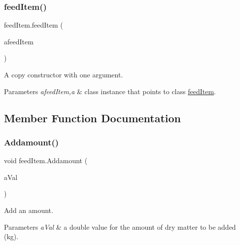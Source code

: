 \subsubsection{\texorpdfstring{feedItem()}{feedItem()}\hspace{0.1cm}{\footnotesize\ttfamily [3/3]}}
{\footnotesize\ttfamily feed\+Item.\+feed\+Item (\begin{DoxyParamCaption}\item[{\mbox{\hyperlink{classfeed_item}{feed\+Item}}}]{afeed\+Item }\end{DoxyParamCaption})\hspace{0.3cm}{\ttfamily [inline]}}



A copy constructor with one argument. 


\begin{DoxyParams}{Parameters}
{\em afeed\+Item,a} & class instance that points to class \mbox{\hyperlink{classfeed_item}{feed\+Item}}. \\
\hline
\end{DoxyParams}


\subsection{Member Function Documentation}
\mbox{\label{classfeed_item_a7b662aa8b1ac382a6c2e27e45ca486bd}} 
\subsubsection{\texorpdfstring{Addamount()}{Addamount()}}
{\footnotesize\ttfamily void feed\+Item.\+Addamount (\begin{DoxyParamCaption}\item[{double}]{a\+Val }\end{DoxyParamCaption})\hspace{0.3cm}{\ttfamily [inline]}}



Add an amount. 


\begin{DoxyParams}{Parameters}
{\em a\+Val} & a double value for the amount of dry matter to be added (kg). \\
\hline
\end{DoxyParams}
\mbox{\label{classfeed_item_a9d4d5c145e4196c035034388e8d0a9a4}} 
